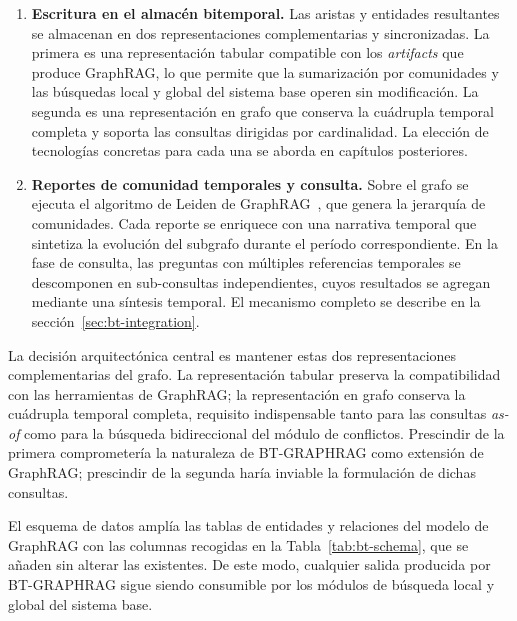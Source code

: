\begin{enumerate}
    \item \textbf{Escritura en el almacén bitemporal.} Las aristas y entidades resultantes se almacenan en dos representaciones complementarias y sincronizadas. La primera es una representación tabular compatible con los \emph{artifacts} que produce GraphRAG, lo que permite que la sumarización por comunidades y las búsquedas local y global del sistema base operen sin modificación. La segunda es una representación en grafo que conserva la cuádrupla temporal completa y soporta las consultas dirigidas por cardinalidad. La elección de tecnologías concretas para cada una se aborda en capítulos posteriores.
    \item \textbf{Reportes de comunidad temporales y consulta.} Sobre el grafo se ejecuta el algoritmo de Leiden de GraphRAG~\cite{traag2019leiden}, que genera la jerarquía de comunidades. Cada reporte se enriquece con una narrativa temporal que sintetiza la evolución del subgrafo durante el período correspondiente. En la fase de consulta, las preguntas con múltiples referencias temporales se descomponen en sub-consultas independientes, cuyos resultados se agregan mediante una síntesis temporal. El mecanismo completo se describe en la sección~\ref{sec:bt-integration}.
\end{enumerate}


La decisión arquitectónica central es mantener estas dos representaciones complementarias del grafo. La representación tabular preserva la compatibilidad con las herramientas de GraphRAG; la representación en grafo conserva la cuádrupla temporal completa, requisito indispensable tanto para las consultas \emph{as-of} como para la búsqueda bidireccional del módulo de conflictos. Prescindir de la primera comprometería la naturaleza de BT-GRAPHRAG como extensión de GraphRAG; prescindir de la segunda haría inviable la formulación de dichas consultas.

El esquema de datos amplía las tablas de entidades y relaciones del modelo de GraphRAG con las columnas recogidas en la Tabla~\ref{tab:bt-schema}, que se añaden sin alterar las existentes. De este modo, cualquier salida producida por BT-GRAPHRAG sigue siendo consumible por los módulos de búsqueda local y global del sistema base.


